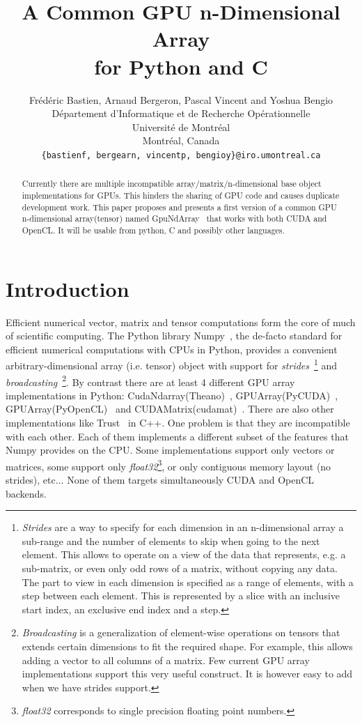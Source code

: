 \documentclass{article} %
\title{A Common GPU n-Dimensional Array \\
 for Python and C}
\author{
Frédéric Bastien, Arnaud Bergeron, Pascal Vincent and Yoshua Bengio \\
D\'epartement d'Informatique et de Recherche Op\'erationnelle\\
Universit\'e de Montr\'eal\\
Montr\'eal, Canada \\
\texttt{\{bastienf, bergearn, vincentp, bengioy\}@iro.umontreal.ca} \\
}
\begin{document}
\maketitle

\begin{abstract}
Currently there are multiple incompatible array/matrix/n-dimensional base object implementations for GPUs. 
This hinders the sharing of GPU code and causes duplicate development work.
This paper proposes and presents a first version of a common GPU n-dimensional array(tensor) named GpuNdArray~\citep{GpuNdArray} that works with both CUDA and OpenCL.
It will be usable from python, C and possibly other languages.
\end{abstract}

\section{Introduction}
Efficient numerical vector, matrix and tensor computations form the core of much of scientific computing.
The Python library Numpy~\citep{numpy-2007}, the de-facto standard for efficient numerical computations with CPUs in Python, provides a convenient 
arbitrary-dimensional array (i.e. tensor) object with support for \emph{strides}~\footnote{
\emph{Strides} are a way to specify for each dimension in an n-dimensional array a sub-range and the number of elements to skip when going
to the next element. 
This allows to operate on a view of the data that represents, e.g. a sub-matrix, or even only odd rows of a matrix, without copying any data.
The part to view in each dimension is specified as a range of elements, with a step between each element.
This is represented by a slice with an inclusive start index, an exclusive end index and a step.
}
and \emph{broadcasting}~\footnote{
\emph{Broadcasting} is a generalization of element-wise operations on tensors that extends certain dimensions to fit the required shape.
For example, this allows adding a vector to all columns of a matrix.
Few current GPU array implementations support this very useful construct.
It is however easy to add when we have strides support.
}.
By contrast there are at least 4 different GPU array implementations in
Python: CudaNdarray(Theano)~\citep{bergstra+al:2010-scipy},
GPUArray(PyCUDA)~\citep{kloeckner_pycuda_2009},
GPUArray(PyOpenCL)~\citep{kloeckner_pycuda_2009} and
CUDAMatrix(cudamat)~\citep{cudamat-TR2009}. 
There are also other implementations like Trust~\citep{Thrust} in C++. 
One problem is that they are incompatible with each other. 
Each of them implements a different subset of the features that Numpy provides on the CPU.
Some implementations support only vectors or matrices, some support only \emph{float32}\footnote{
\emph{float32} corresponds to single precision floating point numbers.
}, or only contiguous memory layout (no strides), etc$\ldots$
None of them targets simultaneously CUDA and OpenCL backends.
\end{document}
